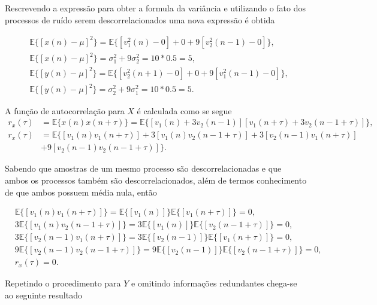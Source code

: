 \documentclass[a4paper,10pt]{article}
\begin{document}
\begin{enumerate}
\begin{enumerate}
						Rescrevendo a expressão para obter a formula da variância e utilizando o fato dos processos de ruído serem descorrelacionados uma nova expressão é obtida
						
						\begin{align}
							&\mathbb{E}\{[x(n) - \mu]^{2}\} = \mathbb{E}\{ [v^{2}_{1}(n) - 0] + 0 + 9[v^{2}_{2}(n-1) - 0]\}, \\
							&\mathbb{E}\{[x(n) - \mu]^{2}\} = \sigma^{2}_{1} + 9\sigma^{2}_{2} = 10*0.5 = 5, \\
							&\mathbb{E}\{[y(n) - \mu]^{2}\} = \mathbb{E}\{ [v^{2}_{2}(n+1) - 0] + 0 + 9[v^{2}_{1}(n-1) - 0]\}, \\
							&\mathbb{E}\{[y(n) - \mu]^{2}\} = \sigma^{2}_{2} + 9\sigma^{2}_{1} = 10*0.5 = 5.
						\end{align}
						
						A função de autocorrelação para $X$ é calculada como se segue 
						\begin{align}
							r_{x}(\tau) &= \mathbb{E}\{x(n)x(n + \tau)\} = \mathbb{E}\{[v_{1}(n) + 3v_{2}(n-1)][v_{1}(n + \tau) + 3v_{2}(n-1 + \tau)]\}, \\
							r_{x}(\tau) &= \mathbb{E}\{[v_{1}(n)v_{1}(n + \tau)] + 3[v_{1}(n)v_{2}(n-1 + \tau)] + 3[v_{2}(n-1)v_{1}(n + \tau)] \\ 
							&+ 9[v_{2}(n-1)v_{2}(n-1 + \tau)] \}.    
						\end{align}
						
						Sabendo que amostras de um mesmo processo são descorrelacionadas e que ambos os processos também são descorrelacionados, além de termos conhecimento 
						de que ambos possuem média nula, então 
						
						\begin{align}
							&\mathbb{E}\{[v_{1}(n)v_{1}(n + \tau)]\} = \mathbb{E}\{[v_{1}(n)]\} \mathbb{E}\{[v_{1}(n + \tau)]\} = 0, \\ 
							&3\mathbb{E}\{[v_{1}(n)v_{2}(n-1 + \tau)]\} = 3\mathbb{E}\{[v_{1}(n)]\} \mathbb{E}\{[v_{2}(n-1 + \tau)]\} = 0, \\
							&3\mathbb{E}\{[v_{2}(n-1)v_{1}(n + \tau)]\} = 3\mathbb{E}\{[v_{2}(n-1)]\} \mathbb{E}\{[v_{1}(n + \tau)]\} = 0, \\
							&9\mathbb{E}\{[v_{2}(n-1)v_{2}(n-1 + \tau)]\} = 9\mathbb{E}\{[v_{2}(n-1)]\} \mathbb{E}\{[v_{2}(n-1 + \tau)]\} = 0, \\ 
							&r_{x}(\tau) = 0.
						\end{align}
						
						Repetindo o procedimento para $Y$ e omitindo informações redundantes chega-se ao seguinte resultado
						

\end{enumerate}
\end{enumerate}
\end{document}
